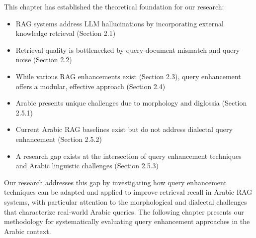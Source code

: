 This chapter has established the theoretical foundation for our research:

\begin{itemize}
    \item RAG systems address LLM hallucinations by incorporating external knowledge retrieval (Section 2.1)
    \item Retrieval quality is bottlenecked by query-document mismatch and query noise (Section 2.2)
    \item While various RAG enhancements exist (Section 2.3), query enhancement offers a modular, effective approach (Section 2.4)
    \item Arabic presents unique challenges due to morphology and diglossia (Section 2.5.1)
    \item Current Arabic RAG baselines exist but do not address dialectal query enhancement (Section 2.5.2)
    \item A research gap exists at the intersection of query enhancement techniques and Arabic linguistic challenges (Section 2.5.3)
\end{itemize}

Our research addresses this gap by investigating how query enhancement techniques can be adapted and applied to improve retrieval recall in Arabic RAG systems, with particular attention to the morphological and dialectal challenges that characterize real-world Arabic queries. The following chapter presents our methodology for systematically evaluating query enhancement approaches in the Arabic context.
